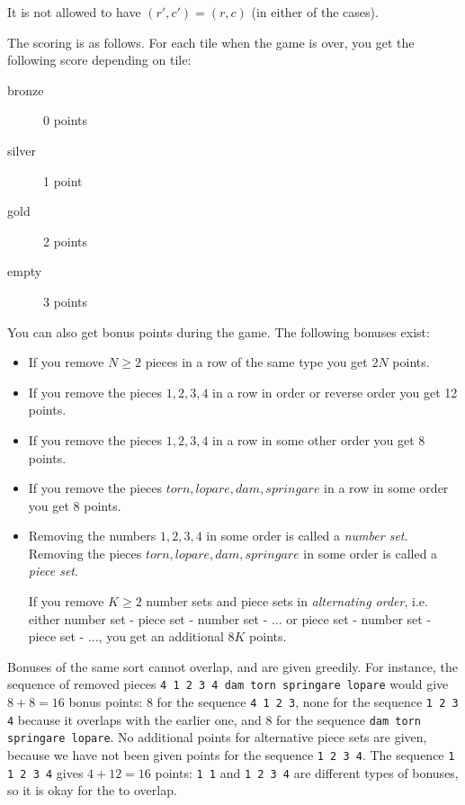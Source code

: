 It is not allowed to have $(r', c') = (r, c)$ (in either of the cases).

The scoring is as follows. For each tile when the game is over, you get the following score depending on tile:
\begin{description}
  \item[bronze] 0 points
  \item[silver] 1 point
  \item[gold] 2 points
  \item[empty] 3 points
\end{description}

You can also get bonus points during the game. The following bonuses exist:
\begin{itemize}
  \item If you remove $N \ge 2$ pieces in a row of the same type you get $2N$ points.
  \item If you remove the pieces $1, 2, 3, 4$ in a row in order or reverse order you get 12 points.
  \item If you remove the pieces $1, 2, 3, 4$ in a row in some other order you get 8 points.
  \item If you remove the pieces $torn, lopare, dam, springare$ in a row in some order you get 8 points.
  \item Removing the numbers $1, 2, 3, 4$ in some order is called a \emph{number set}.
    Removing the pieces $torn, lopare, dam, springare$ in some order is called a \emph{piece set}.

    If you remove $K \ge 2$ number sets and piece sets in \emph{alternating order}, i.e. either
    number set - piece set - number set - ... or piece set - number set - piece set - ..., you get an additional $8K$ points.
\end{itemize}

Bonuses of the same sort cannot overlap, and are given greedily.
For instance, the sequence of removed pieces \texttt{4 1 2 3 4 dam torn springare lopare} would give $8 + 8 = 16$ bonus points:
8 for the sequence \texttt{4 1 2 3},
none for the sequence \texttt{1 2 3 4} because it overlaps with the earlier one,
and 8 for the sequence \texttt{dam torn springare lopare}.
No additional points for alternative piece sets are given, because we
have not been given points for the sequence \texttt{1 2 3 4}.
The sequence \texttt{1 1 2 3 4} gives $4 + 12 = 16$ points: \texttt{1 1} and \texttt{1 2 3 4} are different types of bonuses, so it is okay for the to overlap.

